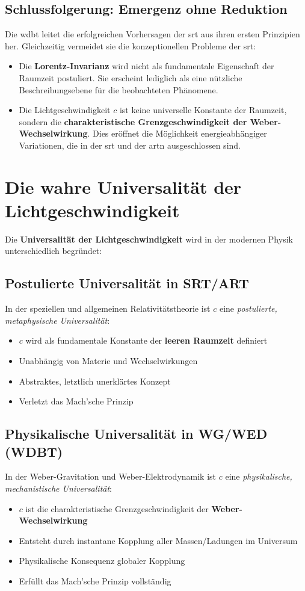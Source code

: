 \subsection{Schlussfolgerung: Emergenz ohne Reduktion}
Die \gls{wdbt} leitet die erfolgreichen Vorhersagen der \gls{srt} aus ihren ersten Prinzipien her. Gleichzeitig vermeidet sie die konzeptionellen Probleme der \gls{srt}:

\begin{itemize}
    \item Die \textbf{Lorentz-Invarianz} wird nicht als fundamentale Eigenschaft der Raumzeit postuliert. Sie erscheint lediglich als eine nützliche Beschreibungsebene für die beobachteten Phänomene.
    \item Die Lichtgeschwindigkeit $c$ ist keine universelle Konstante der Raumzeit, sondern die \textbf{charakteristische Grenzgeschwindigkeit der Weber-Wechselwirkung}. Dies eröffnet die Möglichkeit energieabhängiger Variationen, die in der \gls{srt} und der \gls{artn} ausgeschlossen sind.
\end{itemize}

\section{Die wahre Universalität der Lichtgeschwindigkeit}

Die \textbf{Universalität der Lichtgeschwindigkeit} wird in der modernen Physik unterschiedlich begründet:

\subsection{Postulierte Universalität in SRT/ART}
In der speziellen und allgemeinen Relativitätstheorie ist $c$ eine \textit{postulierte, metaphysische Universalität}:
\begin{itemize}
    \item $c$ wird als fundamentale Konstante der \textbf{leeren Raumzeit} definiert
    \item Unabhängig von Materie und Wechselwirkungen
    \item Abstraktes, letztlich unerklärtes Konzept
    \item Verletzt das Mach'sche Prinzip
\end{itemize}

\subsection{Physikalische Universalität in WG/WED (WDBT)}
In der Weber-Gravitation und Weber-Elektrodynamik ist $c$ eine \textit{physikalische, mechanistische Universalität}:
\begin{itemize}
    \item $c$ ist die charakteristische Grenzgeschwindigkeit der \textbf{Weber-Wechselwirkung}
    \item Entsteht durch instantane Kopplung aller Massen/Ladungen im Universum
    \item Physikalische Konsequenz globaler Kopplung
    \item Erfüllt das Mach'sche Prinzip vollständig
\end{itemize}

